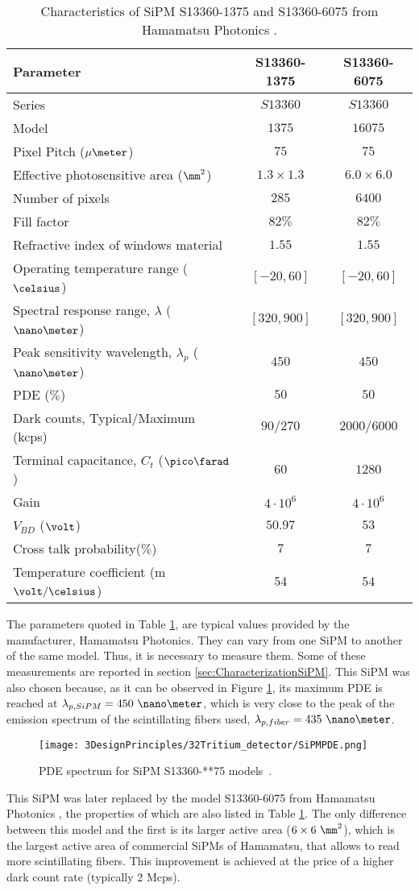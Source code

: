 \begin{table}[htbp]
\centering{}%
\begin{tabular}{lcc}
\toprule 
Parameter & S13360-1375 & S13360-6075 \tabularnewline
\midrule
\midrule 
Series & $S13360$ & $S13360$ \tabularnewline
Model & $1375$ & $16075$ \tabularnewline
Pixel Pitch ($\mu\meter$) & $75$ & $75$ \tabularnewline
Effective photosensitive area ($\mm^2$) & $1.3 \times 1.3$ & $6.0 \times 6.0$ \tabularnewline
Number of pixels & $285$ & $6400$ \tabularnewline
Fill factor & $82\%$ & $82\%$ \tabularnewline
Refractive index of windows material & $1.55$ & $1.55$ \tabularnewline
Operating temperature range ($\celsius$) & $[-20,60]$ & $[-20,60]$ \tabularnewline
Spectral response range, $\lambda$ ($\nano\meter$) & $[320, 900]$ & $[320, 900]$ \tabularnewline
Peak sensitivity wavelength, $\lambda_p$ ($\nano\meter$) & $450$ & $450$ \tabularnewline
PDE ($\%$) & $50$ & $50$ \tabularnewline
Dark counts, Typical/Maximum (kcps) & $90/270$ & $2000/6000$ \tabularnewline
Terminal capacitance, $C_t$ ($\pico\farad$) & $60$ & $1280$ \tabularnewline
Gain & $4 \cdot{} 10^6$ & $4 \cdot{} 10^6$ \tabularnewline
$V_{BD}$ ($\volt$) & $50.97$ & $53$ \tabularnewline
Cross talk probability($\%$) & $7$ & $7$ \tabularnewline
Temperature coefficient (m$\volt/\celsius$) & $54$ & $54$ \tabularnewline
\bottomrule
\end{tabular}
\caption{Characteristics of SiPM S13360-1375 and S13360-6075 from Hamamatsu Photonics \cite{DataSheetHammamatsu_1_SiPM_1375}.}
\label{tab:PropertiesOfSiPM1375}
\end{table}

The parameters quoted in Table \ref{tab:PropertiesOfSiPM1375}, are typical values provided by the manufacturer, Hamamatsu Photonics. They can vary from one SiPM to another of the same model. Thus, it is necessary to measure them. Some of these measurements are reported in section \ref{sec:CharacterizationSiPM}.  This SiPM was also chosen because, as it can be observed in Figure \ref{fig:PDESiPM}, its maximum PDE is reached at $\lambda_{p,SiPM}=450~\nano\meter$, which is very close to the peak of the emission spectrum of the scintillating fibers used, $\lambda_{p,fiber}=435~\nano\meter$.

\begin{figure}[htbp]
\centering
\texttt{[image: 3DesignPrinciples/32Tritium\_detector/SiPMPDE.png]}
\caption{PDE spectrum for SiPM S13360-**75 models~\cite{DataSheetHammamatsu_1_SiPM_1375}.\label{fig:PDESiPM}}
\end{figure}
This SiPM was later replaced by the model S13360-6075 from Hamamatsu Photonics \cite{DataSheetHammamatsu_1_SiPM_75}, the properties of which are also listed in Table \ref{tab:PropertiesOfSiPM1375}. The only difference between this model and the first is its larger active area ($6\times6~\mm^2$), which is the largest active area of commercial SiPMs of Hamamatsu, that allows to read more scintillating fibers. This improvement is achieved at the price of a higher dark count rate (typically 2 Mcps). %

